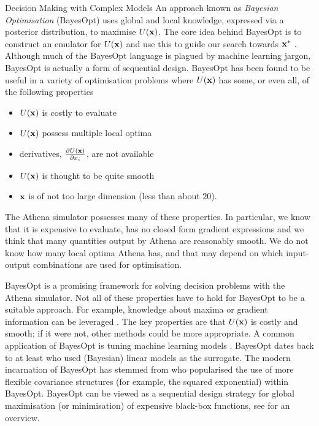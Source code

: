 \begin{chapter}{Decision Making with Complex Models \label{Chap:optimisation}}
An approach known as \textit{Bayesian Optimisation} (BayesOpt) uses global and local knowledge, expressed via a posterior distribution, to maximise $U(\mathbf{x})$. The core idea behind BayesOpt is to construct an emulator for $U(\mathbf{x})$ and use this to guide our search towards $\mathbf{x}^{*}$ \citep{Frazier2018}. Although much of the BayesOpt language is plagued by machine learning jargon, BayesOpt is actually a form of sequential design. BayesOpt has been found to be useful in a variety of optimisation problems where $U(\mathbf{x})$ has some, or even all, of the following properties
\begin{itemize}
 \item $U(\mathbf{x})$ is costly to evaluate
 \item $U(\mathbf{x})$ possess multiple local optima
 \item derivatives, $\frac{\partial U(\mathbf{x})}{\partial x_i}$, are not available
 \item $U(\mathbf{x})$ is thought to be quite smooth
 \item $\mathbf{x}$ is of not too large dimension (less than about $20$).
\end{itemize}
The Athena simulator possesses many of these properties. In particular, we know that it is expensive to evaluate, has no closed form gradient expressions and we think that many quantities output by Athena are reasonably smooth. We do not know how many local optima Athena has, and that may depend on which input-output combinations are used for optimisation.

BayesOpt is a promising framework for solving decision problems with the Athena simulator. Not all of these properties have to hold for BayesOpt to be a suitable approach. For example, knowledge about maxima or gradient information can be leveraged \citep{Wu2017, Nguyen2020}. The key properties are that $U(\mathbf{x})$ is costly and smooth; if it were not, other methods could be more appropriate. A common application of BayesOpt is tuning machine learning models \citep{Joy2016, Snoek2012}. BayesOpt dates back to at least \citet{Mockus1975} who used (Bayesian) linear models as the surrogate. The modern incarnation of BayesOpt has stemmed from \citet{Jones1998} who popularised the use of more flexible covariance structures (for example, the squared exponential) within BayesOpt. BayesOpt can be viewed as a sequential design strategy for global maximisation (or minimisation) of expensive black-box functions, see \citet{Frazier2018} for an overview.


\end{chapter}
